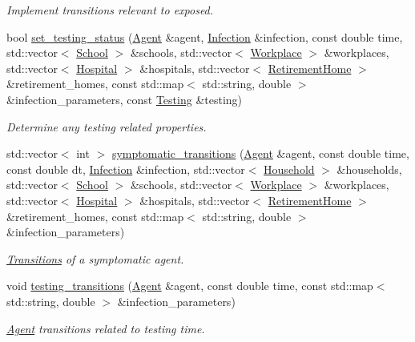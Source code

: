 \begin{DoxyCompactItemize}
\begin{DoxyCompactList}\small\item\em Implement transitions relevant to exposed. \end{DoxyCompactList}\item 
bool \hyperlink{classRegularTransitions_a56dfcdad1824424a61177af9cfc71774}{set\+\_\+testing\+\_\+status} (\hyperlink{classAgent}{Agent} \&agent, \hyperlink{classInfection}{Infection} \&infection, const double time, std\+::vector$<$ \hyperlink{classSchool}{School} $>$ \&schools, std\+::vector$<$ \hyperlink{classWorkplace}{Workplace} $>$ \&workplaces, std\+::vector$<$ \hyperlink{classHospital}{Hospital} $>$ \&hospitals, std\+::vector$<$ \hyperlink{classRetirementHome}{Retirement\+Home} $>$ \&retirement\+\_\+homes, const std\+::map$<$ std\+::string, double $>$ \&infection\+\_\+parameters, const \hyperlink{classTesting}{Testing} \&testing)
\begin{DoxyCompactList}\small\item\em Determine any testing related properties. \end{DoxyCompactList}\item 
std\+::vector$<$ int $>$ \hyperlink{classRegularTransitions_ae207e3f62417ace774bd2f8e043a14de}{symptomatic\+\_\+transitions} (\hyperlink{classAgent}{Agent} \&agent, const double time, const double dt, \hyperlink{classInfection}{Infection} \&infection, std\+::vector$<$ \hyperlink{classHousehold}{Household} $>$ \&households, std\+::vector$<$ \hyperlink{classSchool}{School} $>$ \&schools, std\+::vector$<$ \hyperlink{classWorkplace}{Workplace} $>$ \&workplaces, std\+::vector$<$ \hyperlink{classHospital}{Hospital} $>$ \&hospitals, std\+::vector$<$ \hyperlink{classRetirementHome}{Retirement\+Home} $>$ \&retirement\+\_\+homes, const std\+::map$<$ std\+::string, double $>$ \&infection\+\_\+parameters)
\begin{DoxyCompactList}\small\item\em \hyperlink{classTransitions}{Transitions} of a symptomatic agent. \end{DoxyCompactList}\item 
void \hyperlink{classRegularTransitions_a509724bc00971b19a8ac9569cbc84de2}{testing\+\_\+transitions} (\hyperlink{classAgent}{Agent} \&agent, const double time, const std\+::map$<$ std\+::string, double $>$ \&infection\+\_\+parameters)
\begin{DoxyCompactList}\small\item\em \hyperlink{classAgent}{Agent} transitions related to testing time. \end{DoxyCompactList}\item 

\end{DoxyCompactItemize}
